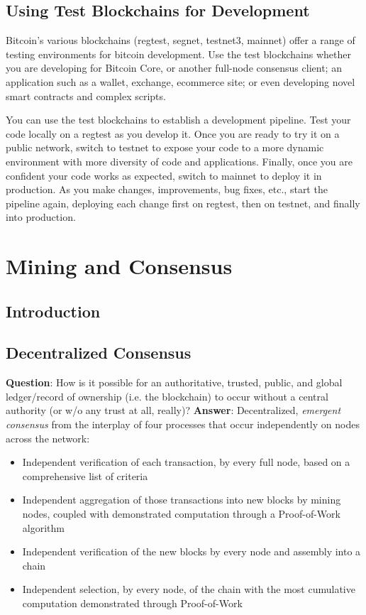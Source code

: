 \documentclass[english, 11pt]{article}
\begin{document}
\subsection{Using Test Blockchains for Development}
\noindent Bitcoin’s various blockchains (regtest, segnet, testnet3, mainnet) offer a range of testing environments for bitcoin development. Use the test blockchains whether you are developing for Bitcoin Core, or another full-node consensus client; an application such as a wallet, exchange, ecommerce site; or even developing novel smart contracts and complex scripts.

You can use the test blockchains to establish a development pipeline. Test your code locally on a regtest as you develop it. Once you are ready to try it on a public network, switch to testnet to expose your code to a more dynamic environment with more diversity of code and applications. Finally, once you are confident your code works as expected, switch to mainnet to deploy it in production. As you make changes, improvements, bug fixes, etc., start the pipeline again, deploying each change first on regtest, then on testnet, and finally into production.
\section{Mining and Consensus}

\subsection{Introduction}

\subsection{Decentralized Consensus}

\noindent \textbf{Question}: How is it possible for an authoritative, trusted, public, and global ledger/record of ownership (i.e. the blockchain) to occur without a central authority (or w/o any trust at all, really)? \textbf{Answer}: Decentralized, \textit{emergent consensus} from the interplay of four processes that occur independently on nodes across the network:

\begin{itemize}
    \item Independent verification of each transaction, by every full node, based on a comprehensive list of criteria
    \item Independent aggregation of those transactions into new blocks by mining nodes, coupled with demonstrated computation through a Proof-of-Work algorithm
    \item Independent verification of the new blocks by every node and assembly into a chain
    \item Independent selection, by every node, of the chain with the most cumulative computation demonstrated through Proof-of-Work
\end{itemize}
\end{document}
